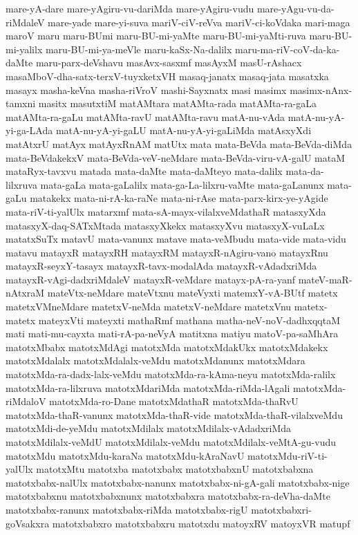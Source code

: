 {mare-yA-dare
mare-yAgiru-vu-dariMda
mare-yAgiru-vudu
mare-yAgu-vu-da-riMdaleV
mare-yade
mare-yi-suva
mariV-ciV-reVva
mariV-ci-koVdaka
mari-maga
maroV
maru
maru-BUmi
maru-BU-mi-yaMte
maru-BU-mi-yaMti-ruva
maru-BU-mi-yalilx
maru-BU-mi-ya-meVle
maru-kaSx-Na-dalilx
maru-ma-riV-coV-da-ka-daMte
maru-parx-deVshavu
masAvx-sasxmf
masAyxM
masU-rAshacx
masaMboV-dha-satx-terxV-tuyxketxVH
masaq-janatx
masaq-jata
masatxka
masayx
masha-keVna
masha-riVroV
mashi-Sayxnatx
masi
masimx
masimx-nAnx-tamxni
masitx
masutxtiM
matAMtara
matAMta-rada
matAMta-ra-gaLa
matAMta-ra-gaLu
matAMta-ravU
matAMta-ravu
matA-nu-vAda
matA-nu-yA-yi-ga-LAda
matA-nu-yA-yi-gaLU
matA-nu-yA-yi-gaLiMda
matAsxyXdi
matAtxrU
matAyx
matAyxRnAM
matUtx
mata
mata-BeVda
mata-BeVda-diMda
mata-BeVdakekxV
mata-BeVda-veV-neMdare
mata-BeVda-viru-vA-galU
mataM
mataRyx-tavxvu
matada
mata-daMte
mata-daMteyo
mata-dalilx
mata-da-lilxruva
mata-gaLa
mata-gaLalilx
mata-ga-La-lilxru-vaMte
mata-gaLanunx
mata-gaLu
matakekx
mata-ni-rA-ka-raNe
mata-ni-rAse
mata-parx-kirx-ye-yAgide
mata-riV-ti-yalUlx
matarxmf
mata-sA-mayx-vilalxveMdathaR
matasxyXda
matasxyX-daq-SATxMtada
matasxyXkekx
matasxyXvu
matasxyX-vuLaLx
matatxSuTx
matavU
mata-vanunx
matave
mata-veMbudu
mata-vide
mata-vidu
matavu
matayxR
matayxRH
matayxRM
matayxR-nAgiru-vano
matayxRnu
matayxR-seyxY-tasayx
matayxR-tavx-modalAda
matayxR-vAdadxriMda
matayxR-vAgi-dadxriMdaleV
matayxR-veMdare
matayx-pA-ra-yanf
mateV-maR-nAtxraM
mateVtx-neMdare
mateVtxnu
mateVyxti
matemxY-vA-BUtf
matetx
matetxVMneMdare
matetxV-neMda
matetxV-neMdare
matetxVnu
matetx-matetx
mateyxVti
mateyxti
mathaRmf
mathana
matha-neV-noV-dadhxqqtaM
mati
mati-mu-cayxta
mati-rA-pa-neVyA
matitxna
matiyu
matoV-pa-saMhAra
matotxMbabx
matotxMdAgi
matotxMda
matotxMdakUkx
matotxMdakekx
matotxMdalalx
matotxMdalalx-veMdu
matotxMdanunx
matotxMdara
matotxMda-ra-dadx-lalx-veMdu
matotxMda-ra-kAma-neyu
matotxMda-ralilx
matotxMda-ra-lilxruva
matotxMdariMda
matotxMda-riMda-lAgali
matotxMda-riMdaloV
matotxMda-ro-Dane
matotxMdathaR
matotxMda-thaRvU
matotxMda-thaR-vanunx
matotxMda-thaR-vide
matotxMda-thaR-vilalxveMdu
matotxMdi-de-yeMdu
matotxMdilalx
matotxMdilalx-vAdadxriMda
matotxMdilalx-veMdU
matotxMdilalx-veMdu
matotxMdilalx-veMtA-gu-vudu
matotxMdu
matotxMdu-karaNa
matotxMdu-kAraNavU
matotxMdu-riV-ti-yalUlx
matotxMtu
matotxba
matotxbabx
matotxbabxnU
matotxbabxna
matotxbabx-nalUlx
matotxbabx-nanunx
matotxbabx-ni-gA-gali
matotxbabx-nige
matotxbabxnu
matotxbabxnunx
matotxbabxra
matotxbabx-ra-deVha-daMte
matotxbabx-ranunx
matotxbabx-riMda
matotxbabx-rigU
matotxbabxri-goVsakxra
matotxbabxro
matotxbabxru
matotxdu
matoyxRV
matoyxVR
matupf
}
